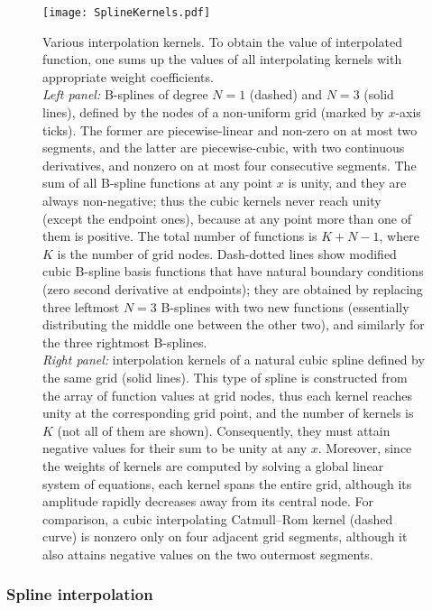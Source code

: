 \documentclass[12pt]{article}
\begin{document}
\begin{figure}
\begin{center}
\texttt{[image: SplineKernels.pdf]}
\end{center}
\caption{Various interpolation kernels. To obtain the value of interpolated function, one sums up the values of all interpolating kernels with appropriate weight coefficients. \protect\\
\textit{Left panel:} B-splines of degree $N=1$ (dashed) and $N=3$ (solid lines), defined by the nodes of a non-uniform grid (marked by $x$-axis ticks). The former are piecewise-linear and non-zero on at most two segments, and the latter are piecewise-cubic, with two continuous derivatives, and nonzero on at most four consecutive segments. The sum of all B-spline functions at any point $x$ is unity, and they are always non-negative; thus the cubic kernels never reach unity (except the endpoint ones), because at any point more than one of them is positive.
The total number of functions is $K+N-1$, where $K$ is the number of grid nodes.
Dash-dotted lines show modified cubic B-spline basis functions that have natural boundary conditions (zero second derivative at endpoints); they are obtained by replacing three leftmost $N=3$ B-splines with two new functions (essentially distributing the middle one between the other two), and similarly for the three rightmost B-splines.\protect\\
\textit{Right panel:} interpolation kernels of a natural cubic spline defined by the same grid (solid lines). This type of spline is constructed from the array of function values at grid nodes, thus each kernel reaches unity at the corresponding grid point, and the number of kernels is $K$ (not all of them are shown). Consequently, they must attain negative values for their sum to be unity at any $x$. Moreover, since the weights of kernels are computed by solving a global linear system of equations, each kernel spans the entire grid, although its amplitude rapidly decreases away from its central node. For comparison, a cubic interpolating Catmull--Rom kernel (dashed curve) is nonzero only on four adjacent grid segments, although it also attains negative values on the two outermost segments. } \label{fig:SplineKernels}
\end{figure}

\subsubsection{Spline interpolation}  \label{sec:MathSplineDetails}
\end{document}
